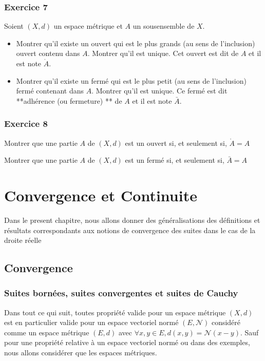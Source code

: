 \documentclass[letterpaper,10pt,french]{sphinxmanual}
\begin{document}
\subsection{Exercice 7}
\label{\detokenize{exo_metric:exercice-7}}
\sphinxAtStartPar
Soient \((X,d)\) un espace métrique et \(A\) un sous\sphinxhyphen{}ensemble de \(X\).
\begin{itemize}
\item {} 
\sphinxAtStartPar
Montrer qu’il existe un ouvert qui est le plus grands (au sens de l’inclusion) ouvert contenu dans \(A\). Montrer qu’il est unique. Cet ouvert est dit  de \(A\) et il est note \(\mathring{A}\).

\item {} 
\sphinxAtStartPar
Montrer qu’il existe un fermé qui est le plus petit (au sens de l’inclusion) fermé contenant dans \(A\). Montrer qu’il est unique. Ce fermé est dit **adhérence (ou fermeture) ** de \(A\) et il est note \(\bar{A}\).

\end{itemize}


\subsection{Exercice 8}
\label{\detokenize{exo_metric:exercice-8}}
\sphinxhyphen{} Montrer que une partie \(A\) de \((X, d)\) est un ouvert si, et seulement si, \(\mathring{A}=A\)

\sphinxhyphen{} Montrer que une partie \(A\) de \((X, d)\) est un fermé si, et seulement si, \(\bar{A}=A\)


\chapter{Convergence et Continuite}
\label{\detokenize{convconttopo:convergence-et-continuite}}\label{\detokenize{convconttopo::doc}}
\sphinxAtStartPar
Dans le present chapitre, nous allons donner des généralisations des définitions et résultats correspondants aux notions de convergence des suites dans le cas de la droite réelle


\section{Convergence}
\label{\detokenize{convergence:convergence}}\label{\detokenize{convergence::doc}}

\subsection{Suites bornées, suites convergentes et suites de Cauchy}
\label{\detokenize{convergence:suites-bornees-suites-convergentes-et-suites-de-cauchy}}
\sphinxAtStartPar
Dans tout ce qui suit, toutes propriété valide pour un espace métrique \((X, d)\) est en particulier valide pour un espace vectoriel normé \((E,\mathcal N)\) considéré comme un espace métrique \((E,d)\) avec \(\forall x,y \in E, d(x,y)=\mathcal N(x-y)\). Sauf pour une propriété relative à un espace vectoriel normé ou dans des exemples, nous allons considérer que les espaces métriques.
\end{document}
